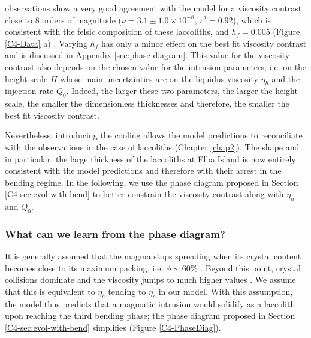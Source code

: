 observations show a very good agreement with the model for a viscosity
contrast      close      to      $8$     orders      of      magnitude
($\nu = 3.1\pm  1.0 \times 10^{-8}$, $r^2=0.92$),  which is consistent
with  the  felsic composition  of  these  laccoliths, and  $h_f=0.005$
(Figure \ref{C4-Data} a) \citep{Marsh:1981dc,Diniega:2013eh}.  Varying
$h_f$ has only  a minor effect on the best  fit viscosity contrast and
is discussed in Appendix  \ref{sec:phase-diagram}.  This value for the
viscosity contrast also depends on  the chosen value for the intrusion
parameters, i.e. on the height  scale $H$ whose main uncertainties are
on  the liquidus  viscosity  $\eta_h$ and  the  injection rate  $Q_0$.
Indeed, the larger these two  parameters, the larger the height scale,
the smaller  the dimensionless thicknesses and  therefore, the smaller
the best fit viscosity contrast.

Nevertheless, introducing the cooling  allows the model predictions to
reconciliate with the observations in  the case of laccoliths (Chapter
\ref{chap2}).  The shape and in particular, the large thickness of the
laccoliths at  Elba Island is  now entirely consistent with  the model
predictions and therefore with their arrest in the bending regime.  In
the  following,  we   use  the  phase  diagram   proposed  in  Section
\ref{C4-sec:evol-with-bend} to better constrain the viscosity contrast
along with $\eta_h$ and $Q_0$.

\subsubsection*{What can we learn from the phase diagram?}

It  is generally  assumed  that  the magma  stops  spreading when  its
crystal   content  becomes   close  to   its  maximum   packing,  i.e.
$\phi  \sim  60\%$   \citep{Pinkerton:1992fwa}.   Beyond  this  point,
crystal collisions  dominate and  the viscosity  jumps to  much higher
values \citep{Lejeune:1995fc,Giordano:2008em}.  We assume that this is
equivalent to  $\eta_e$ tending to  $\eta_c$ in our model.   With this
assumption, the  model thus predicts  that a magmatic  intrusion would
solidify as  a laccolith  upon reaching the  third bending  phase; the
phase   diagram   proposed  in   Section   \ref{C4-sec:evol-with-bend}
simplifies (Figure \ref{C4-PhaseDiag}).

